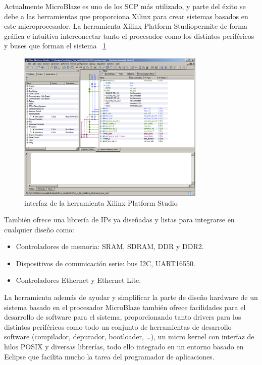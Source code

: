 Actualmente MicroBlaze es uno de los SCP más utilizado, y parte del éxito se debe
a las herramientas que proporciona Xilinx para crear sistemas basados en este
microprocesador. La herramienta Xilinx Platform Studio\cite{Etiqueta26}permite de forma gráfica e
intuitiva interconectar tanto el procesador como los distintos periféricos y buses que forman
el sistema
~\ref{fig:Xilinx Platform Studio}

\begin{figure}[h!]
 	\begin{center}
  	\includegraphics[width=0.8\textwidth,keepaspectratio=true]{./images/herramientaxps}
  	\caption{interfaz de la herramienta Xilinx Platform Studio}
  	\label{fig:Xilinx Platform Studio}
 	\end{center}
	\end{figure}

También ofrece una librería de IPs ya diseñadas y listas para integrarse en cualquier diseño como:

		\begin{itemize}
		  \item  Controladores de memoria: SRAM, SDRAM, DDR y DDR2.
	 	 \item  Dispositivos de comunicación serie: bus I2C, UART16550.
	 	 \item Controladores Ethernet y Ethernet Lite.
		\end{itemize}

La herramienta además de ayudar y simplificar la parte de diseño hardware de un sistema basado en el procesador MicroBlaze también ofrece facilidades para el desarrollo de software para el sistema, proporcionando tanto drivers para los distintos periféricos como todo un conjunto de herramientas de desarrollo software (compilador, depurador, bootloader, …), un micro kernel con interfaz de hilos POSIX y diversas librerías, todo ello integrado en un entorno basado en Eclipse\cite{Etiqueta27} que facilita mucho la tarea del programador de aplicaciones.

